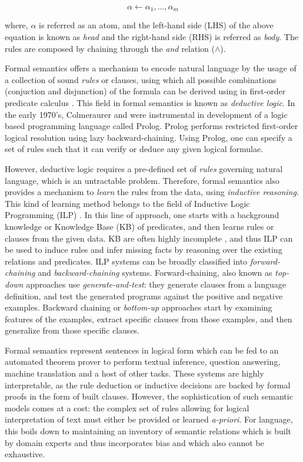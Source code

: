 \documentclass[letterpaper, 12pt]{report}
\begin{document}
\begin{equation}
    \alpha \leftarrow \alpha_1, ... , \alpha_m
\end{equation}

\noindent where, $\alpha$ is referred as an atom, and the left-hand side (LHS) of the above equation is known as \textit{head} and the right-hand side (RHS) is referred as \textit{body}. The rules are composed by chaining through the \textit{and} relation ($\land$).

Formal semantics offers a mechanism to encode natural language by the usage of a collection of sound \textit{rules} or clauses, using which all possible combinations (conjuction and disjunction) of the formula can be derived using in first-order predicate calculus \cite{hofstadter1980godel}.
This field in formal semantics is known as \textit{deductive logic}. In the early 1970's, Colmeraurer and \citet{kowalski1979logic} were instrumental in development of a logic based programming language called Prolog. Prolog performs restricted first-order logical resolution using lazy backward-chaining. Using Prolog, one can specify a set of rules such that it can verify or deduce any given logical formulae.

However, deductive logic requires a pre-defined set of \textit{rules} governing natural language, which is an untractable problem. Therefore, formal semantics also provides a mechanism to \textit{learn} the rules from the data, using \textit{inductive reasoning}. This kind of learning method belongs to the field of Inductive Logic Programming (ILP) \cite{dvzeroski2009relational}. In this line of approach, one starts with a background knowledge or Knowledge Base (KB) of predicates, and then learns rules or clauses from the given data. KB are often highly incomplete \cite{min2013distant}, and thus ILP can be used to induce rules and infer missing facts by reasoning over the existing relations and predicates. ILP systems can be broadly classified into \textit{forward-chaining} and \textit{backward-chaining} systems. Forward-chaining, also known as \textit{top-down} approaches use \textit{generate-and-test}: they generate clauses from a language definition, and test the generated programs against the positive and negative examples. Backward chaining or \textit{bottom-up} approaches start by examining features of the examples, extract specific clauses from those examples, and then generalize from those specific clauses.

Formal semantics represent sentences in logical form which can be fed to an automated theorem prover to perform textual inference, question answering, machine translation and a host of other tasks.
These systems are highly interpretable, as the rule deduction or inductive decisions are backed by formal proofs in the form of built clauses. However, the sophistication of such semantic models comes at a cost: the complex set of rules allowing for logical interpretation of text must either be provided or learned \textit{a-priori}. For language, this boils down to maintaining an inventory of semantic relations \cite{MacCartney2009-sz} which is built by domain experts and thus incorporates bias and which also cannot be exhaustive.
\end{document}
